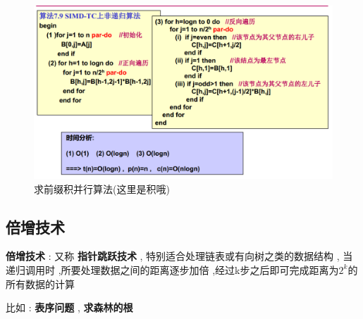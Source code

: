 \documentclass[UTF8,a4paper]{ctexart}
\begin{document}
  \begin{figure}[H]
    \centering
    \includegraphics[scale = 0.3]{assets/ParallelComputing_903f7.png}
    \caption{求前缀积并行算法(这里是积哦)}
  \end{figure}

  \subsection{倍增技术}
  \textbf{倍增技术} : 又称 \textbf{指针跳跃技术} , 特别适合处理链表或有向树之类的数据结构 , 当递归调用时 ,所要处理数据之间的距离逐步加倍 ,经过k步之后即可完成距离为$2^k$的所有数据的计算

  比如 : \textbf{表序问题} , \textbf{求森林的根}
\end{document}
